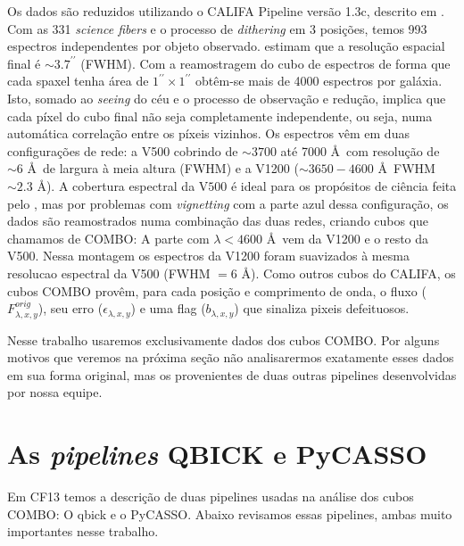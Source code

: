 Os dados são reduzidos utilizando o CALIFA Pipeline versão 1.3c, descrito em \citet{Husemann2013}. Com as 331 {\em
science fibers} e o processo de {\em dithering} em 3 posições, temos 993 espectros independentes por objeto observado.
\citet{Husemann2013} estimam que a resolução espacial final é $\sim3.7^{\prime\prime}$ (FWHM). Com a reamostragem do
cubo de espectros de forma que cada spaxel tenha área de $1^{\prime\prime} \times 1^{\prime\prime}$ obtêm-se mais de
4000 espectros por galáxia. Isto, somado ao {\em seeing} do céu e o processo de observação e redução, implica que cada
píxel do cubo final não seja completamente independente, ou seja, numa automática correlação entre os píxeis vizinhos.
Os espectros vêm em duas configurações de rede: a V500 cobrindo de $\sim 3700$ até 7000 \AA\ com resolução de $\sim 6$
\AA\ de largura à meia altura (FWHM) e a V1200 ($\sim 3650-4600$ \AA\ FWHM $\sim2.3$ \AA). A cobertura espectral da
V$500$ é ideal para os propósitos de ciência feita pelo \starlight, mas por problemas com {\em vignetting} com a parte
azul dessa configuração, os dados são reamostrados numa combinação das duas redes, criando cubos que chamamos de COMBO:
A parte com $\lambda < 4600$ \AA\ vem da V1200 e o resto da V500. Nessa montagem os espectros da V1200 foram suavizados
à mesma resolucao espectral da V500 (FWHM $= 6$ \AA). Como outros cubos do CALIFA, os cubos COMBO provêm, para cada
posição e comprimento de onda, o fluxo ($F_{\lambda,x,y}^{orig}$), seu erro ($\epsilon_{\lambda,x,y}$) e uma flag
($b_{\lambda,x,y}$) que sinaliza pixeis defeituosos.

Nesse trabalho usaremos exclusivamente dados dos cubos COMBO. Por alguns motivos que veremos na próxima seção não
analisarermos exatamente esses dados em sua forma original, mas os provenientes de duas outras pipelines desenvolvidas
por nossa equipe.


\section{As {\em pipelines} QBICK e PyCASSO}
\label{sec:CALePyC:pipelines}

Em CF13 temos a descrição de duas pipelines usadas na análise dos cubos COMBO: O {\sc qbick} e o PyCASSO. Abaixo
revisamos essas pipelines, ambas muito importantes nesse trabalho.

